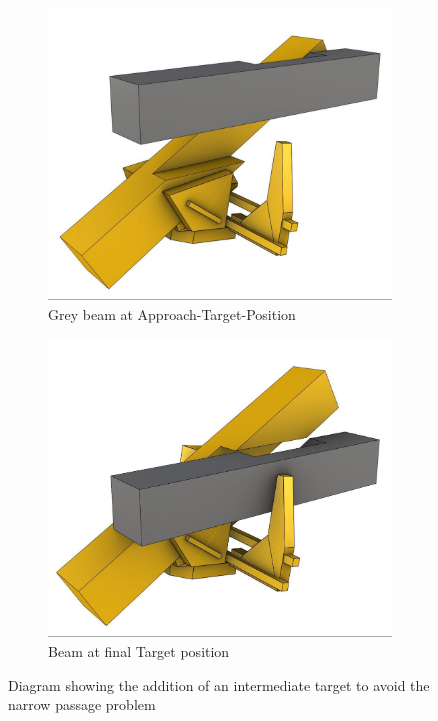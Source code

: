\begin{figure}[!h]
    \centering
    \begin{subfigure}[b]{0.49\textwidth}
        \centering
        \includegraphics[width=\textwidth]{images/05/image74.jpg}
        \caption{Grey beam at Approach-Target-Position}
        \label{fig:narrow-passage-by-clamp-jaw-solved1}
    \end{subfigure}
    \hfill
    \begin{subfigure}[b]{0.49\textwidth}
        \centering
        \includegraphics[width=\textwidth]{images/05/image101.jpg}
        \caption{Beam at final Target position}
        \label{fig:narrow-passage-by-clamp-jaw-solved2}
    \end{subfigure}
    \caption{Diagram showing the addition of an intermediate target to avoid the narrow passage problem}
    \label{fig:narrow-passage-by-clamp-jaw-solved}
\end{figure}


